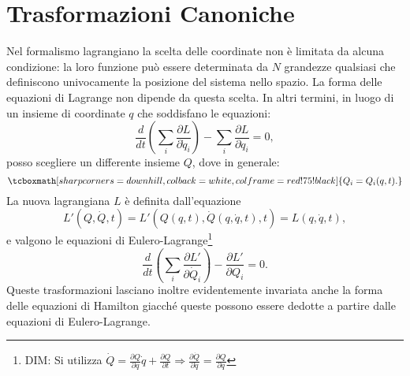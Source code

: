 \section[Trasformazioni Canoniche]{Trasformazioni Canoniche}
Nel formalismo lagrangiano la scelta delle coordinate non \`e limitata da alcuna condizione: la loro funzione pu\`o essere determinata da $N$ grandezze qualsiasi che definiscono univocamente la posizione del sistema nello spazio. La forma delle equazioni di Lagrange non dipende da questa scelta. In altri termini, in luogo di un insieme di coordinate $q$ che soddisfano le equazioni:
	\begin{equation}
		\frac{d}{dt}  \left( \sum_i\frac{\partial L}{\partial \dot{q}_i} \right) - \sum_i \frac{\partial L}{\partial q_i} = 0 ,
	\end{equation}
posso scegliere un differente insieme $Q$, dove in generale:
	\begin{equation}
		\tcboxmath[sharp corners=downhill ,colback=white,colframe=red!75!black]{
			Q_i = Q_i(q,t) .
			}
		\label{eq:cap6_1}
	\end{equation}
La nuova lagrangiana $L$ \`e definita dall'equazione
	\begin{equation}
		L'(Q,\dot{Q},t) = L'\left(Q(q,t), \dot {Q}(q, \dot{q}, t), t \right) = L(q,\dot{q},t) ,
	\end{equation}
e valgono le equazioni di Eulero-Lagrange\footnote{DIM: Si utilizza $\dot{Q} = \frac{\partial Q}{\partial q}\dot{q} + \frac{\partial Q}{\partial t} \Rightarrow \frac{\partial \dot{Q}}{\partial \dot{q}} = \frac{\partial Q}{\partial q}$ }
	\begin{equation}
		\frac{d}{dt} \left( \sum_i \frac{\partial L'}{\partial \dot{Q}_i} \right) - \frac{\partial L'}{\partial Q_i} = 0 .
	\end{equation}
Queste trasformazioni lasciano inoltre evidentemente invariata anche la forma delle equazioni di Hamilton giacch\'e queste possono essere dedotte a partire dalle equazioni di Eulero-Lagrange.\\

